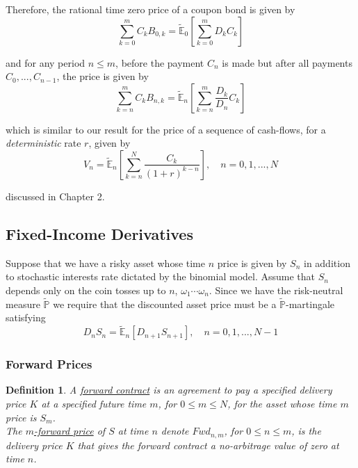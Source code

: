 \documentclass[12pt]{article}
\newtheorem{definition}{Definition}
\newlength\tindent
\renewcommand{\indent}{\hspace*{\tindent}}
\renewcommand{\P}{\mathbb P}
\newcommand{\E}{\mathbb E}
\begin{document}
Therefore, the rational time zero price of a coupon bond is given by
\begin{equation*}
	\sum^m_{k = 0} C_k B_{0,k} = \tilde{\E}_0 \left[ \sum^m_{k = 0} D_kC_k \right]
\end{equation*}

and for any period $n \leq m$, before the payment $C_n$ is made but after all payments $C_0,...,C_{n - 1}$, the price is given by
\begin{equation*}
	\sum^m_{k = n} C_k B_{n,k} = \tilde{\E}_n \left[ \sum^m_{k = n} \frac{ D_k }{D_n} C_k \right]
\end{equation*}

which is similar to our result for the price of a sequence of cash-flows, for a {\em deterministic} rate $r$, given by
\begin{equation*}
	V_n = \tilde{\E}_n \left[ \sum^N_{k = n} \frac{C_k}{(1 + r)^{k - n}} \right], \quad n = 0,1,...,N
\end{equation*}

discussed in Chapter 2.

\subsection{Fixed-Income Derivatives}

\indent Suppose that we have a risky asset whose time $n$ price is given by $S_n$ in addition to stochastic interests rate dictated by the binomial model. Assume that $S_n$ depends only on the coin tosses up to $n$, $\omega_1\cdots\omega_n$. Since we have the risk-neutral measure $\tilde{\P}$ we require that the discounted asset price must be a $\tilde{\P}$-martingale satisfying
\begin{equation*}
	D_nS_n = \tilde{\E}_n[D_{n + 1}S_{n + 1}], \quad n = 0,1,...,N - 1
\end{equation*}

\subsubsection{Forward Prices}

\begin{definition} A \underline{forward contract} is an agreement to pay a specified delivery price $K$ at a specified future time $m$, for $0 \leq m \leq N$, for the asset whose time $m$ price is $S_m$. \\

\indent The \underline{$m$-forward price} of $S$ at time $n$ denote $Fwd_{n,m}$, for $0 \leq n \leq m$, is the delivery price $K$ that gives the forward contract a no-arbitrage value of zero at time $n$.
\end{definition}
\end{document}
